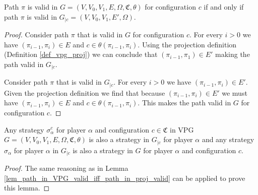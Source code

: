 \begin{lemma}
	\label{lem_path_in_VPG_valid_iff_path_in_proj_valid}
	Path $\pi$ is valid in $G = (V,V_0,V_1,E,\Omega,\mathfrak{C},\theta)$ for configuration $c$ if and only if path $\pi$ is valid in $G_{|c} = (V,V_0,V_1,E',\Omega)$.
	\begin{proof}
		Consider path $\pi$ that is valid in $G$ for configuration $c$. For every $i>0$ we have $(\pi_{i-1},\pi_i) \in E$ and $c \in \theta(\pi_{i-1},\pi_i)$. Using the projection definition (Definition \ref{def_vpg_proj}) we can conclude that $(\pi_{i-1},\pi_1) \in E'$ making the path valid in $G_{|c}$.
		
		Consider path $\pi$ that is valid in $G_{|c}$. For every $i > 0$ we have $(\pi_{i-1},\pi_i) \in E'$. Given the projection definition we find that because $(\pi_{i-1},\pi_i) \in E'$ we must have $(\pi_{i-1},\pi_i) \in E$ and $c \in \theta(\pi_{i-1},\pi_i)$. This makes the path valid in $G$ for configuration $c$.
	\end{proof}
\end{lemma}

\begin{lemma}
	\label{lem_start_in_VPG_valid_iff_start_in_proj_valid}
	Any strategy $\sigma_\alpha^c$ for player $\alpha$ and configuration $c \in \mathfrak{C}$ in VPG $G = (V,V_0,V_1,E,\Omega,\mathfrak{C},\theta)$ is also a strategy in $G_{|c}$ for player $\alpha$ and any strategy $\sigma_\alpha$ for player $\alpha$ in $G_{|c}$ is also a strategy in $G$ for player $\alpha$ and configuration $c$.
	\begin{proof}
		The same reasoning as in Lemma \ref{lem_path_in_VPG_valid_iff_path_in_proj_valid} can be applied to prove this lemma.
	\end{proof}
\end{lemma}

